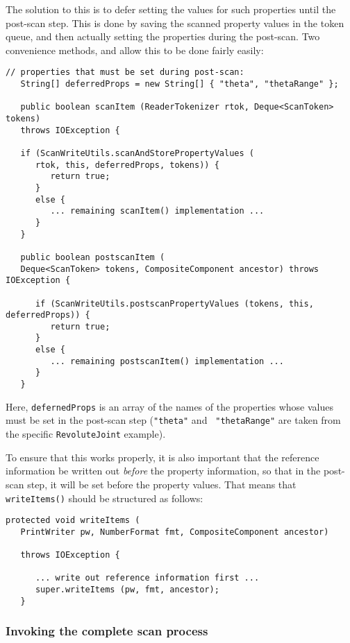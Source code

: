 \documentclass{article}
\begin{document}
The solution to this is to defer setting the values for such
properties until the post-scan step. This is done by saving the
scanned property values in the token queue, and then actually setting
the properties during the post-scan. Two convenience methods,
and 
allow this to be done fairly easily:
\begin{lstlisting}[]
   // properties that must be set during post-scan:
   String[] deferredProps = new String[] { "theta", "thetaRange" };

   public boolean scanItem (ReaderTokenizer rtok, Deque<ScanToken> tokens)
   throws IOException {

   if (ScanWriteUtils.scanAndStorePropertyValues (
      rtok, this, deferredProps, tokens)) {
         return true;
      }
      else {
         ... remaining scanItem() implementation ...
      }
   }

   public boolean postscanItem (
   Deque<ScanToken> tokens, CompositeComponent ancestor) throws IOException {

      if (ScanWriteUtils.postscanPropertyValues (tokens, this, deferredProps)) {
         return true;
      }
      else {
         ... remaining postscanItem() implementation ...
      }
   }
\end{lstlisting}
Here, {\tt defernedProps} is an array of the names of the properties
whose values must be set in the post-scan step ({\tt "theta"} and {\tt
"thetaRange"} are taken from the specific {\tt RevoluteJoint} example).

To ensure that this works properly, it is also important that the
reference information be written out {\it before} the property
information, so that in the post-scan step, it will be set before the
property values.  That means that {\tt writeItems()} should be
structured as follows:
\begin{lstlisting}[]
   protected void writeItems (
   PrintWriter pw, NumberFormat fmt, CompositeComponent ancestor) 

   throws IOException {

      ... write out reference information first ...
      super.writeItems (pw, fmt, ancestor);
   }
\end{lstlisting}

\subsubsection{Invoking the complete scan process}
\end{document}

